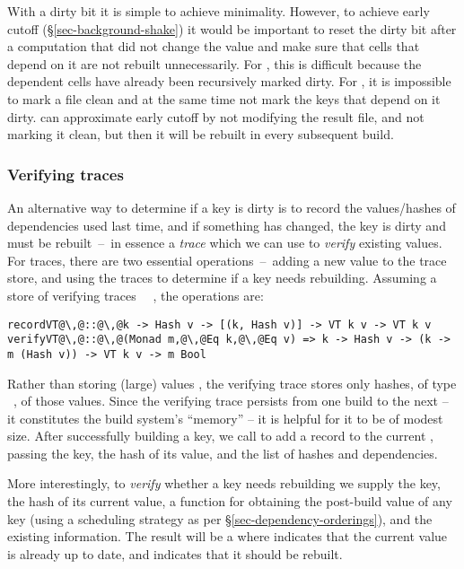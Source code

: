 With a dirty bit it is simple to achieve minimality. However, to achieve early
cutoff (\S\ref{sec-background-shake}) it would be important to reset the dirty
bit after a computation that did not change the value and make sure that cells
that depend on it are not rebuilt unnecessarily. For \Excel, this is difficult
because the dependent cells have already been recursively marked dirty. For
\Make, it is impossible to mark a file clean and at the same time not mark the
keys that depend on it dirty. \Make can approximate early cutoff by not
modifying the result file, and not marking it clean, but then it will be rebuilt
in every subsequent build.

\vspace{-2mm}
\subsubsection{Verifying traces}\label{sec-verifying-traces}

An alternative way to determine if a key is dirty is to record the
values/hashes of dependencies used last time, and if something has changed, the
key is dirty and must be rebuilt~--~in essence a \emph{trace} which we can use
to \emph{verify} existing values. For traces, there are two essential
operations~--~adding a new value to the trace store, and using the traces to
determine if a key needs rebuilding. Assuming a store of verifying traces
~~, the operations are:

\begin{verbatim}
recordVT@\,@::@\,@k -> Hash v -> [(k, Hash v)] -> VT k v -> VT k v
verifyVT@\,@::@\,@(Monad m,@\,@Eq k,@\,@Eq v) => k -> Hash v -> (k -> m (Hash v)) -> VT k v -> m Bool
\end{verbatim}

\noindent
Rather than storing (large) values , the verifying trace  stores
only hashes, of type ~, of those values. Since the verifying
trace persists from one build to the next -- it constitutes the build system's
``memory'' -- it is helpful for it to be of modest size. After successfully
building a key, we call  to add a record to the current ,
passing the key, the hash of its value, and the list of hashes and dependencies.

More interestingly, to \emph{verify} whether a key needs rebuilding we supply
the key, the hash of its current value, a function for obtaining the post-build
value of any key (using a scheduling strategy as per
\S\ref{sec-dependency-orderings}), and the existing  information. The
result will be a  where  indicates that the current value is
already up to date, and  indicates that it should be rebuilt.

